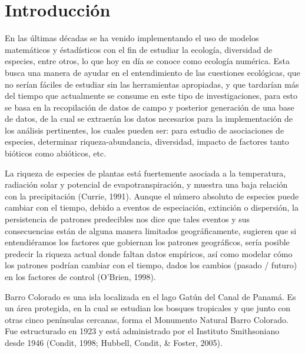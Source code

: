 \documentclass[11pt,]{article}
\begin{document}
\vskip 6.5pt


\noindent  \section{Introducción}\label{introducciuxf3n}

En las últimas décadas se ha venido implementando el uso de modelos
matemáticos y éstadísticos con el fin de estudiar la ecología,
diversidad de especies, entre otros, lo que hoy en día se conoce como
ecología numérica. Esta busca una manera de ayudar en el entendimiento
de las cuestiones ecológicas, que no serían fáciles de estudiar sin las
herramientas apropiadas, y que tardarían más del tiempo que actualmente
se consume en este tipo de investigaciones, para esto se basa en la
recopilación de datos de campo y posterior generación de una base de
datos, de la cual se extraerán los datos necesarios para la
implementación de los análisis pertinentes, los cuales pueden ser: para
estudio de asociaciones de especies, determinar riqueza-abundancia,
diversidad, impacto de factores tanto bióticos como abióticos, etc.

La riqueza de especies de plantas está fuertemente asociada a la
temperatura, radiación solar y potencial de evapotranspiración, y
muestra una baja relación con la precipitación (Currie, 1991). Aunque el
número absoluto de especies puede cambiar con el tiempo, debido a
eventos de especiación, extinción o dispersión, la persistencia de
patrones predecibles nos dice que tales eventos y sus consecuencias
están de alguna manera limitados geográficamente, sugieren que si
entendiéramos los factores que gobiernan los patrones geográficos, sería
posible predecir la riqueza actual donde faltan datos empíricos, así
como modelar cómo los patrones podrían cambiar con el tiempo, dados los
cambios (pasado / futuro) en los factores de control (O'Brien, 1998).

Barro Colorado es una isla localizada en el lago Gatún del Canal de
Panamá. Es un área protegida, en la cual se estudian los bosques
tropicales y que junto con otras cinco penínsulas cercanas, forma el
Monumento Natural Barro Colorado. Fue estructurado en 1923 y está
administrado por el Instituto Smithsoniano desde 1946 (Condit, 1998;
Hubbell, Condit, \& Foster, 2005).
\end{document}
